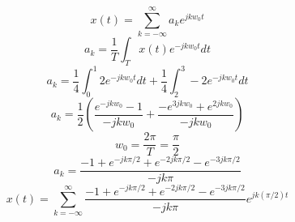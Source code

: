 \documentclass[10pt,a4paper, margin=1in]{article}
\begin{document}
\begin{enumerate}
    \begin{equation}
        x(t) = \sum_{k=-\infty}^{\infty}a_ke^{jkw_0t}
    \end{equation}
    \begin{equation}
        a_k = \frac{1}{T}\int_T x(t)e^{-jkw_0t}dt
    \end{equation}
    \begin{equation}
        a_k = \frac{1}{4}\int_0^1 2e^{-jkw_0t}dt + \frac{1}{4}\int_2^3 -2e^{-jkw_0t}dt
    \end{equation}
    \begin{equation}
        a_k = \frac{1}{2}(\frac{e^{-jkw_0} - 1}{-jkw_0} + \frac{-e^{3jkw_0} +e^{2jkw_0}}{-jkw_0})
    \end{equation}
    \begin{equation}
        w_0 = \frac{2\pi}{T} = \frac{\pi}{2}
    \end{equation}
    \begin{equation}
        a_k = \frac{-1 + e^{-jk\pi/2} + e^{-2jk\pi/2} - e^{-3jk\pi/2}}{-jk\pi}
    \end{equation}
    \begin{equation}
        x(t) = \sum_{k = -\infty}^{\infty} \frac{-1 + e^{-jk\pi/2} + e^{-2jk\pi/2} - e^{-3jk\pi/2}}{-jk\pi} e^{jk(\pi/2)t}
    \end{equation}

\end{enumerate}
\end{document}
